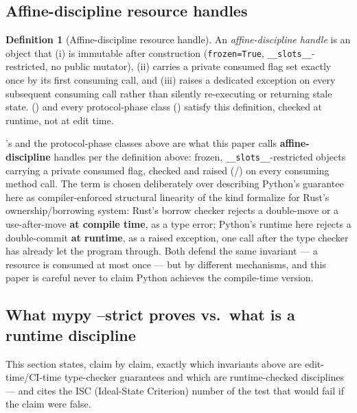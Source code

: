 \documentclass[
  english,
]{article}
\theoremstyle{definition}
\newtheorem{definition}[theorem]{Definition}
\begin{document}
\subsection{Affine-discipline resource
handles}\label{affine-discipline-resource-handles}

\begin{definition}[Affine-discipline resource handle]
An \emph{affine-discipline handle} is an object that (i) is immutable after construction
(\texttt{frozen=True}, \texttt{\_\_slots\_\_}-restricted, no public mutator), (ii) carries a private
consumed flag set exactly once by its first consuming call, and (iii) raises a dedicated exception
on every subsequent consuming call rather than silently re-executing or returning stale state.
 () and every protocol-phase class
() satisfy this definition, checked at runtime, not at edit time.
\end{definition}

's
 and the protocol-phase classes above are what
this paper calls \textbf{affine-discipline} handles per the definition
above: frozen, \texttt{\_\_slots\_\_}-restricted objects carrying a
private consumed flag, checked and raised
(/) on every
consuming method call. The term is chosen deliberately over describing
Python's guarantee here as compiler-enforced structural linearity of the
kind \citet{jung2018rustbelt} formalize for Rust's ownership/borrowing
system: Rust's borrow checker rejects a double-move or a use-after-move
\textbf{at compile time}, as a type error; Python's runtime here rejects
a double-commit \textbf{at runtime}, as a raised exception, one call
after the type checker has already let the program through. Both defend
the same invariant --- a resource is consumed at most once --- but by
different mechanisms, and this paper is careful never to claim Python
achieves the compile-time version.

\subsection{What mypy --strict proves vs.~what is a runtime
discipline}\label{sec:honesty-line}

This section states, claim by claim, exactly which invariants above are
edit-time/CI-time type-checker guarantees and which are runtime-checked
disciplines --- and cites the ISC (Ideal-State Criterion) number of the
test that would fail if the claim were false.
\end{document}

